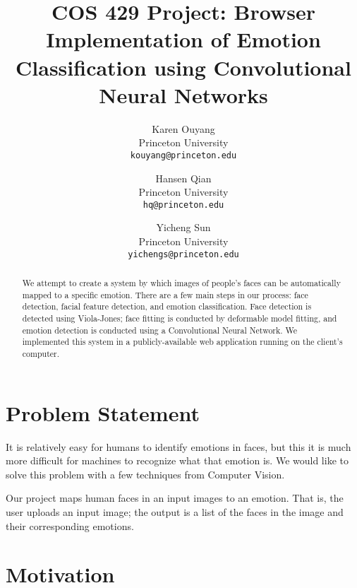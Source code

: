 \documentclass[10pt,twocolumn,letterpaper]{article}
\begin{document}
\title{COS 429 Project: Browser Implementation of Emotion Classification using Convolutional Neural Networks}

\author{Karen Ouyang\\
Princeton University\\
{\tt\small kouyang@princeton.edu}
\and
Hansen Qian\\
Princeton University\\
{\tt\small hq@princeton.edu}
\and
Yicheng Sun\\
Princeton University\\
{\tt\small yichengs@princeton.edu}
}

\maketitle

\begin{abstract}
We attempt to create a system by which images of people's faces can be automatically mapped to a specific emotion. There are a few main steps in our process: face detection, facial feature detection, and emotion classification. Face detection is detected using Viola-Jones; face fitting is conducted by deformable model fitting, and emotion detection is conducted using a Convolutional Neural Network. We implemented this system in a publicly-available web application running on the client's computer.
\end{abstract}

\section{Problem Statement}

It is relatively easy for humans to identify emotions in faces, but this it is much more difficult for machines to recognize what that emotion is. We would like to solve this problem with a few techniques from Computer Vision.

Our project maps human faces in an input images to an emotion. That is, the user uploads an input image; the output is a list of the faces in the image and their corresponding emotions.

\section{Motivation}
\end{document}
